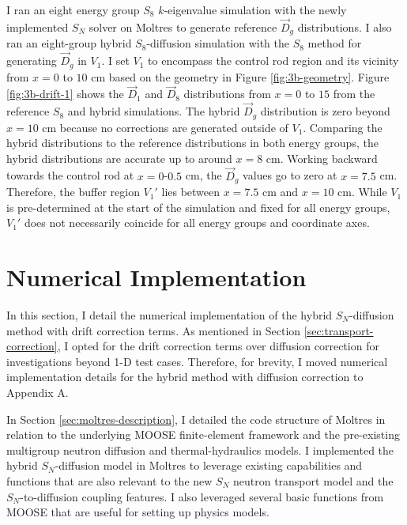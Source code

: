 I ran an eight energy group $S_8$ $k$-eigenvalue simulation with the newly implemented $S_N$ solver
on Moltres to generate reference $\vec{D}_g$ distributions. I also ran an eight-group hybrid
$S_8$-diffusion simulation with the $S_8$ method for generating $\vec{D}_g$ in $V_1$. I set $V_1$
to encompass the control rod region and its vicinity from $x=0$ to $10$ cm based on the geometry in
Figure \ref{fig:3b-geometry}. Figure \ref{fig:3b-drift-1} shows the $\vec{D}_1$ and $\vec{D}_8$
distributions from $x=0$ to $15$ from the reference $S_8$ and hybrid simulations. The hybrid
$\vec{D}_g$ distribution is zero beyond $x=10$ cm because no corrections are generated outside of
$V_1$. Comparing the hybrid distributions to the reference distributions in both energy groups, the
hybrid distributions are accurate up to around $x=8$ cm. Working backward towards the control rod
at $x=0$-$0.5$ cm, the $\vec{D}_g$ values go to zero at $x=7.5$ cm. Therefore, the buffer
region $V_1'$ lies between $x=7.5$ cm and $x=10$ cm. While $V_1$ is pre-determined at the start of
the simulation and fixed for all energy groups, $V_1'$ does not necessarily coincide for all
energy groups and coordinate axes.

\section{Numerical Implementation} \label{sec:numerical-implementation}

In this section, I detail the numerical implementation of the hybrid $S_N$-diffusion method with
drift correction terms. As mentioned in Section \ref{sec:transport-correction}, I opted for the
drift correction terms over diffusion correction for investigations beyond 1-D test cases.
Therefore, for brevity, I moved numerical implementation details for the hybrid method with
diffusion correction to Appendix A.

In Section \ref{sec:moltres-description}, I detailed the code structure of Moltres
\cite{lindsay_moltres_2017} in relation to the underlying \gls{MOOSE} finite-element framework
\cite{giudicelli_30_2024} and the pre-existing multigroup neutron diffusion and thermal-hydraulics
models. I implemented the hybrid $S_N$-diffusion model in Moltres to
leverage existing capabilities and functions that are also relevant to the new $S_N$ neutron
transport model and the $S_N$-to-diffusion coupling features. I also leveraged several basic
functions from \gls{MOOSE} that are useful for setting up physics models.

